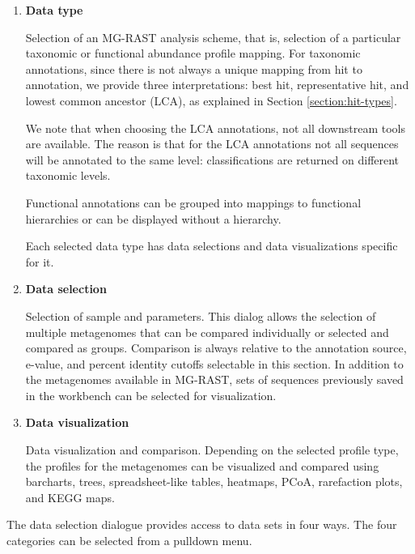 \documentclass[12pt,fullpage]{report}
\begin{document}
\begin{enumerate}

\item \textbf{Data type}

Selection of an MG-RAST analysis scheme, that is, selection of a particular taxonomic or functional abundance profile mapping. For taxonomic annotations, since there is not always a unique mapping from hit to annotation, we provide three interpretations: best hit, representative hit, and lowest common ancestor (LCA), as explained in Section \ref{section:hit-types}.

We note that when choosing the LCA annotations, not all downstream tools are available. The reason is that for the LCA annotations not all sequences will be annotated to the same level: classifications are returned on different taxonomic levels.

Functional annotations can be grouped into mappings to functional hierarchies or can be displayed without a hierarchy. 

Each selected data type has data selections and data visualizations specific for it.

\item \textbf{Data selection}

Selection of sample and parameters. This dialog allows the selection of multiple metagenomes that can be compared individually or selected and compared as groups. Comparison is always relative to the annotation source, e-value, and percent identity cutoffs selectable in this section. In addition to the metagenomes available in MG-RAST, sets of sequences previously saved in the workbench can be selected for visualization.

\item \textbf{Data visualization}

Data visualization and comparison. Depending on the selected profile type, the profiles for the metagenomes can be visualized and compared using barcharts, trees, spreadsheet-like tables, heatmaps, PCoA, rarefaction plots, and KEGG maps.
\end{enumerate}


The data selection dialogue provides access to data sets in four ways. The four categories can be selected from a pulldown menu.
\end{document}

